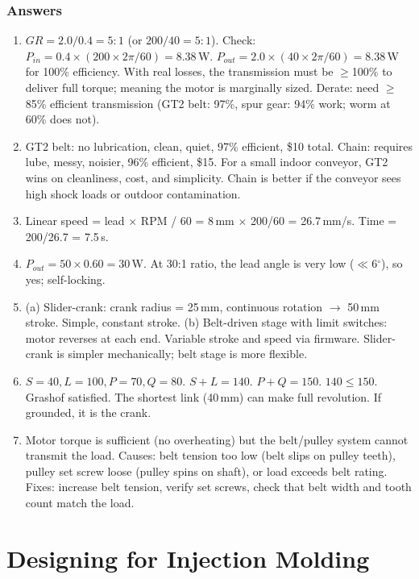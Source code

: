 \documentclass[11pt,letterpaper,twoside,openany]{book}
\providecommand{\ang}[1]{#1\ensuremath{{}^{\circ}}}
\begin{document}
\subsection{Answers}
\begin{enumerate}[leftmargin=1.5em]
\item $GR = 2.0/0.4 = 5:1$ (or $200/40 = 5:1$). Check: $P_{in} = 0.4 \times (200 \times 2\pi/60) = 8.38$\,W. $P_{out} = 2.0 \times (40 \times 2\pi/60) = 8.38$\,W for 100\% efficiency. With real losses, the transmission must be $\geq$100\% to deliver full torque; meaning the motor is marginally sized. Derate: need $\geq$85\% efficient transmission (GT2 belt: 97\%, spur gear: 94\% work; worm at 60\% does not).
\item GT2 belt: no lubrication, clean, quiet, 97\% efficient, \$10 total. Chain: requires lube, messy, noisier, 96\% efficient, \$15. For a small indoor conveyor, GT2 wins on cleanliness, cost, and simplicity. Chain is better if the conveyor sees high shock loads or outdoor contamination.
\item Linear speed = lead $\times$ RPM / 60 = 8\,mm $\times$ 200/60 = 26.7\,mm/s. Time = 200/26.7 = 7.5\,s.
\item $P_{out} = 50 \times 0.60 = 30$\,W. At 30:1 ratio, the lead angle is very low ($\ll$\ang{6}), so yes; self-locking.
\item (a) Slider-crank: crank radius = 25\,mm, continuous rotation $\to$ 50\,mm stroke. Simple, constant stroke. (b) Belt-driven stage with limit switches: motor reverses at each end. Variable stroke and speed via firmware. Slider-crank is simpler mechanically; belt stage is more flexible.
\item $S = 40, L = 100, P = 70, Q = 80$. $S + L = 140$. $P + Q = 150$. $140 \leq 150$. Grashof satisfied. The shortest link (40\,mm) can make full revolution. If grounded, it is the crank.
\item Motor torque is sufficient (no overheating) but the belt/pulley system cannot transmit the load. Causes: belt tension too low (belt slips on pulley teeth), pulley set screw loose (pulley spins on shaft), or load exceeds belt rating. Fixes: increase belt tension, verify set screws, check that belt width and tooth count match the load.
\end{enumerate}

\chapter{Designing for Injection Molding}\label{ch:molding}
\end{document}
